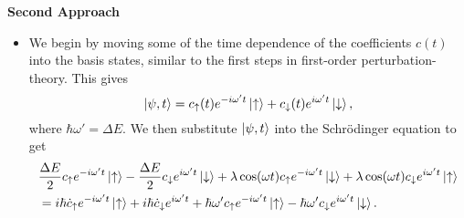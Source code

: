 \documentclass[11pt, a4paper]{article}
\newcommand{\Schro}{Schr\"{o}dinger\xspace}
\newcommand{\p}{\psi}  %
\newcommand{\ua}{\uparrow}  %
\newcommand{\da}{\downarrow}  %
\begin{document}
\textbf{Second Approach}
\begin{itemize}
	\item We begin by moving some of the time dependence of the coefficients $ c(t) $ into the basis states, similar to the first steps in first-order perturbation-theory. This gives
	\begin{equation*}
        \ket{\p, t} = c_{\ua}(t)e^{-i\omega't}\ket{\ua} + c_{\da}(t)e^{i\omega't}\ket{\da},
	\end{equation*}
    where $ \hbar \omega' = \Delta E $. We then substitute $ \ket{\p, t} $ into the \Schro equation to get
	\begin{align*}
        &\frac{\Delta E}{2}c_{\ua}e^{-i\omega't}\ket{\ua} - \frac{\Delta E}{2}c_{\da}e^{i\omega't}\ket{\da} + \lambda \cos (\omega t) c_{\ua}e^{-i\omega't}\ket{\da} +  \lambda \cos(\omega t) c_{\da}e^{i\omega't}\ket{\ua} \\
		&= i \hbar \dot{c}_{\ua}e^{-i\omega't}\ket{\ua} + i\hbar \dot{c}_{\da}e^{i\omega't} + \hbar \omega'c_{\ua}e^{-i\omega't} \ket{\ua} - \hbar \omega'c_{\da}e^{i\omega't}\ket{\da}.
	\end{align*}
    

\end{itemize}
\end{document}
